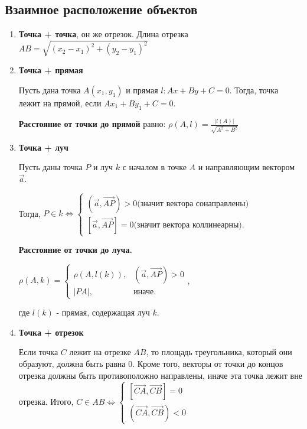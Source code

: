 \subsection*{Взаимное расположение объектов}
\begin{enumerate}
    \item \textbf{Точка + точка}, он же отрезок. Длина отрезка $AB = \sqrt{(x_2 - x_1)^2 + (y_2 - y_1)^2}$
    \item \textbf{Точка + прямая}

    Пусть дана точка $A(x_1, y_1)$ и прямая $l: Ax + By + C = 0$. Тогда, точка лежит на прямой, если $Ax_1 + By_1 + C = 0$.
    
    \textbf{Расстояние от точки до прямой} равно: $\displaystyle \rho(A, l) = \frac{|l(A)|}{\sqrt{A^2 + B^2}}$

    
    \item \textbf{Точка + луч} 

    Пусть даны точка $P$ и луч $k$ с началом в точке $A$ и направляющим вектором $\Vec{a}$. 
    
    Тогда, $P \in k \Leftrightarrow \begin{cases}
    (\Vec{a}, \Vec{AP}) > 0 \textit{(значит вектора сонаправлены)} \\
    [\Vec{a}, \Vec{AP}] = 0\textit{(значит вектора коллинеарны)}.
    \end{cases}
    $

    \textbf{Расстояние от точки до луча.}
    
    $\rho(A, k) = \begin{cases}
    \rho(A, l(k)), & (\Vec{a}, \Vec{AP}) > 0 \\
    |PA|, & \textit{иначе}.
    \end{cases}
    $, 
    
    где $l(k)$ - прямая, содержащая луч $k$.

    \item \textbf{Точка + отрезок}

    Если точка $C$ лежит на отрезке $AB$, то площадь треугольника, который они образуют, должна быть равна 0. Кроме того, векторы от точки до концов отрезка должны быть противоположно направлены, иначе эта точка лежит вне отрезка. Итого, $C \in AB \Leftrightarrow \begin{cases}
        [\Vec{CA}, \Vec{CB}] = 0 \\
        (\Vec{CA}, \Vec{CB}) < 0
    \end{cases}$ 


\end{enumerate}
